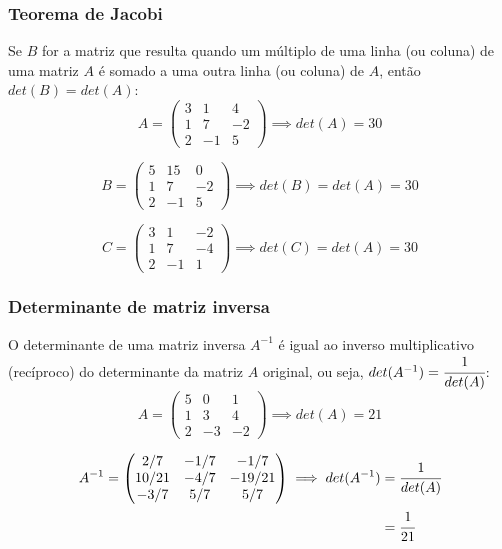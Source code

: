 \documentclass[pdftex, brazil]{beamer}
\begin{document}
\begin{frame}[t]
  \frametitle{Teorema de Jacobi}
  Se $B$ for a matriz que resulta quando um múltiplo de uma linha (ou coluna) de
  uma matriz $A$ é somado a uma outra linha (ou coluna) de $A$, então
  $det(B) = det(A)$:
  $$A = \begin{pmatrix}
    3 & 1 & 4\\
    1 & 7 & -2\\
    2 & -1 & 5\end{pmatrix} \implies det(A) = 30$$

  $$B = \begin{pmatrix}
    5 & 15 & 0\\
    1 & 7 & -2\\
    2 & -1 & 5\end{pmatrix} \implies det(B) = det(A) = 30$$


  $$C = \begin{pmatrix}
    3 & 1 & -2\\
    1 & 7 & -4\\
    2 & -1 & 1\end{pmatrix} \implies det(C) = det(A) = 30$$
\end{frame}

\begin{frame}[t]
  \frametitle{Determinante de matriz inversa}
  O determinante de uma matriz inversa $A^{-1}$ é igual ao inverso
  multiplicativo (recíproco) do determinante da matriz $A$ original, ou seja,
  $det(A^{-1}) = \cfrac{1}{det(A)}$:
  $$A = \begin{pmatrix}
    5 & 0 & 1\\
    1 & 3 & 4\\
    2 & -3 & -2\end{pmatrix} \implies det(A) = 21$$

  \begin{equation*}\begin{split}A^{-1} = \begin{pmatrix}
    2/7 & -1/7 & -1/7\\
    10/21 & -4/7 & -19/21\\
    -3/7 & 5/7 & 5/7\end{pmatrix} \implies det(A^{-1}) &= \cfrac{1}{det(A)}\\ 
                                                       &= \cfrac{1}{21}\end{split}\end{equation*}
\end{frame}
\end{document}
